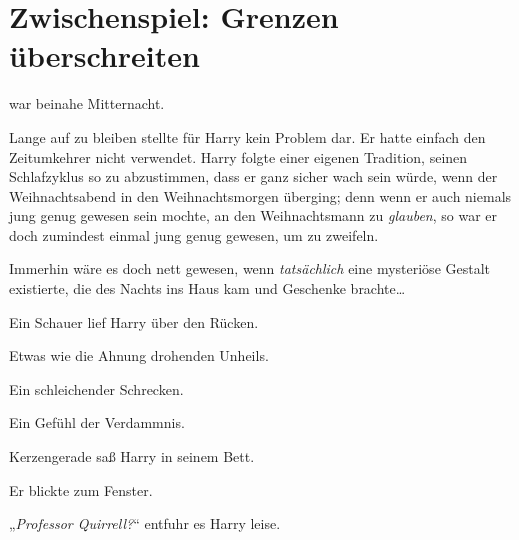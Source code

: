 \chapter{Zwischenspiel: Grenzen überschreiten}

 war beinahe Mitternacht.

\hplettrineextrapara
Lange auf zu bleiben stellte für Harry kein Problem dar. Er hatte einfach den Zeitumkehrer nicht verwendet. Harry folgte einer eigenen Tradition, seinen Schlafzyklus so zu abzustimmen, dass er ganz sicher wach sein würde, wenn der Weihnachtsabend in den Weihnachtsmorgen überging; denn wenn er auch niemals jung genug gewesen sein mochte, an den Weihnachtsmann zu \emph{glauben}, so war er doch zumindest einmal jung genug gewesen, um zu zweifeln.

Immerhin wäre es doch nett gewesen, wenn \emph{tatsächlich} eine mysteriöse Gestalt existierte, die des Nachts ins Haus kam und Geschenke brachte…

Ein Schauer lief Harry über den Rücken.

Etwas wie die Ahnung drohenden Unheils.

Ein schleichender Schrecken.

Ein Gefühl der Verdammnis.

Kerzengerade saß Harry in seinem Bett.

Er blickte zum Fenster.

„\emph{Professor Quirrell?}“ entfuhr es Harry leise.

